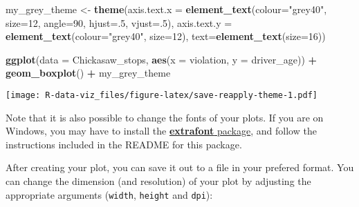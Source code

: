\documentclass[]{book}
\newenvironment{Shaded}{\begin{snugshade}}{\end{snugshade}}
\newcommand{\KeywordTok}[1]{\textcolor[rgb]{0.13,0.29,0.53}{\textbf{#1}}}
\newcommand{\DataTypeTok}[1]{\textcolor[rgb]{0.13,0.29,0.53}{#1}}
\newcommand{\DecValTok}[1]{\textcolor[rgb]{0.00,0.00,0.81}{#1}}
\newcommand{\StringTok}[1]{\textcolor[rgb]{0.31,0.60,0.02}{#1}}
\newcommand{\OperatorTok}[1]{\textcolor[rgb]{0.81,0.36,0.00}{\textbf{#1}}}
\newcommand{\NormalTok}[1]{#1}
\theoremstyle{definition}
\theoremstyle{definition}
\theoremstyle{definition}
\theoremstyle{remark}
\begin{document}
\begin{Shaded}
\begin{Highlighting}[]
\NormalTok{my_grey_theme <-}\StringTok{ }\KeywordTok{theme}\NormalTok{(}\DataTypeTok{axis.text.x =} \KeywordTok{element_text}\NormalTok{(}\DataTypeTok{colour=}\StringTok{"grey40"}\NormalTok{, }\DataTypeTok{size=}\DecValTok{12}\NormalTok{, }\DataTypeTok{angle=}\DecValTok{90}\NormalTok{, }\DataTypeTok{hjust=}\NormalTok{.}\DecValTok{5}\NormalTok{, }\DataTypeTok{vjust=}\NormalTok{.}\DecValTok{5}\NormalTok{),}
                   \DataTypeTok{axis.text.y =} \KeywordTok{element_text}\NormalTok{(}\DataTypeTok{colour=}\StringTok{"grey40"}\NormalTok{, }\DataTypeTok{size=}\DecValTok{12}\NormalTok{), }\DataTypeTok{text=}\KeywordTok{element_text}\NormalTok{(}\DataTypeTok{size=}\DecValTok{16}\NormalTok{))}

\KeywordTok{ggplot}\NormalTok{(}\DataTypeTok{data =}\NormalTok{ Chickasaw_stops, }\KeywordTok{aes}\NormalTok{(}\DataTypeTok{x =}\NormalTok{ violation, }\DataTypeTok{y =}\NormalTok{ driver_age)) }\OperatorTok{+}
\StringTok{  }\KeywordTok{geom_boxplot}\NormalTok{() }\OperatorTok{+}\StringTok{ }
\StringTok{  }\NormalTok{my_grey_theme}
\end{Highlighting}
\end{Shaded}

\texttt{[image: R-data-viz\_files/figure-latex/save-reapply-theme-1.pdf]}

Note that it is also possible to change the fonts of your plots. If you
are on Windows, you may have to install the
\href{https://github.com/wch/extrafont}{\textbf{extrafont} package}, and
follow the instructions included in the README for this package.

After creating your plot, you can save it out to a file in your prefered
format. You can change the dimension (and resolution) of your plot by
adjusting the appropriate arguments (\texttt{width}, \texttt{height} and
\texttt{dpi}):
\end{document}
